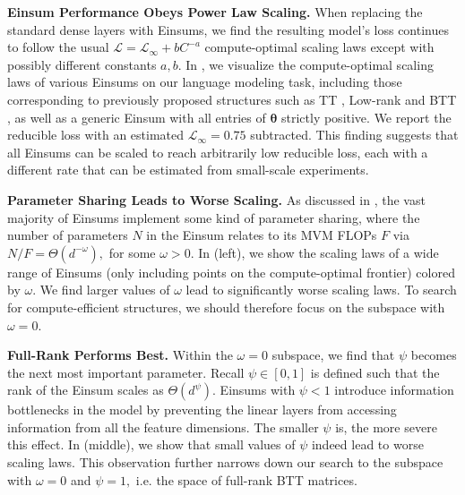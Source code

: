 \documentclass{article}
\newcommand{\mbf}[1]{{\boldsymbol{\mathbf{#1}}}}
\newcommand{\bm}{\mbf}
\renewcommand{\L}{\mathcal{L}}
\begin{document}
\noindent \textbf{Einsum Performance Obeys Power Law Scaling.} \quad
When replacing the standard dense layers with Einsums, we find the resulting model's loss continues to follow the usual $\L  = \L_\infty + b C^{-a}$ compute-optimal scaling laws except with possibly different constants $a,b$. In , we visualize the compute-optimal scaling laws of various Einsums on our language modeling task, including those corresponding to previously proposed structures such as TT \citep{oseledets2011tt}, Low-rank and BTT \citep{qiu2024compute}, as well as a generic Einsum with all entries of $\bm{\theta}$ strictly positive. We report the reducible loss with an estimated $\L_\infty = 0.75$ subtracted. This finding suggests that all Einsums can be scaled to reach arbitrarily low reducible loss, each with a different rate that can be estimated from small-scale experiments.

\noindent \textbf{Parameter Sharing Leads to Worse Scaling.} \quad
As discussed in , the vast majority of Einsums implement some kind of parameter sharing, where the number of parameters $N$ in the Einsum relates to its MVM FLOPs $F$ via $N/F = \Theta(d^{-\omega}),$ for some $\omega > 0.$  In  (left), we show the scaling laws of a wide range of Einsums (only including points on the compute-optimal frontier) colored by $\omega.$ We find larger values of $\omega$ lead to significantly worse scaling laws. To search for compute-efficient structures, we should therefore focus on the subspace with $\omega = 0.$

\noindent \textbf{Full-Rank Performs Best.} \quad
Within the $\omega = 0$ subspace, we find that $\psi$ becomes the next most important parameter. Recall $\psi \in [0, 1]$ is defined such that the rank of the Einsum scales as $\Theta(d^\psi).$ Einsums with $\psi < 1$ introduce information bottlenecks in the model by preventing the linear layers from accessing information from all the feature dimensions. The smaller $\psi$ is,  the more severe this effect. In  (middle), we show that small values of $\psi$ indeed lead to worse scaling laws. This observation further narrows down our search to the subspace with $\omega=0$ and $\psi=1,$ i.e. the space of full-rank BTT matrices.
\end{document}
